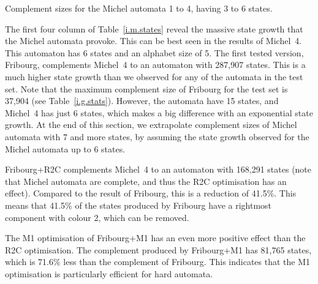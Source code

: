 \begin{table}[htb]
\centering

\caption{Complement sizes for the Michel automata 1 to 4, having 3 to 6 states.}
\label{i.m.states}
\end{table}


The first four column of Table~\ref{i.m.states} reveal the massive state growth that the Michel automata provoke. This can be best seen in the results of Michel~4. This automaton has 6 states and an alphabet size of 5. The first tested version, Fribourg, complements Michel~4 to an automaton with 287,907 states. This is a much higher state growth than we observed for any of the automata in the \goal{} test set. Note that the maximum complement size of Fribourg for the \goal{} test set is 37,904 (see Table~\ref{i.g.stats}). However, the \goal{} automata have 15 states, and Michel~4 has just 6 states, which makes a big difference with an exponential state growth. At the end of this section, we extrapolate complement sizes of Michel automata with 7 and more states, by assuming the state growth observed for the Michel automata up to 6 states.

Fribourg+R2C complements Michel~4 to an automaton with 168,291 states (note that Michel automata are complete, and thus the R2C optimisation has an effect). Compared to the result of Fribourg, this is a reduction of 41.5\%. This means that 41.5\% of the states produced by Fribourg have a rightmost component with colour 2, which can be removed.

The M1 optimisation of Fribourg+M1 has an even more positive effect than the R2C optimisation. The complement produced by Fribourg+M1 has 81,765 states, which is 71.6\% less than the complement of Fribourg. This indicates that the M1 optimisation is particularly efficient for hard automata.

